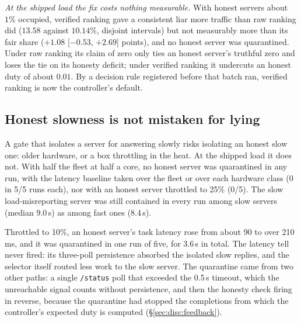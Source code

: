 \documentclass[10pt,twocolumn,letterpaper]{article}
\begin{document}
\emph{At the shipped load the fix costs nothing measurable.} With honest
servers about $1\%$ occupied, verified ranking gave a consistent liar more
traffic than raw ranking did ($13.58$ against $10.14\%$, disjoint intervals)
but not measurably more than its fair share ($+1.08$ [$-0.53$, $+2.69$]
points), and no honest server was quarantined. Under raw ranking its claim of
zero only ties an honest server's truthful zero and loses the tie on its
honesty deficit; under verified ranking it undercuts an honest duty of about
$0.01$. By a decision rule registered before that batch ran, verified ranking
is now the controller's default.

\subsection{Honest slowness is not mistaken for lying}
\label{sec:res:hw}
A gate that isolates a server for answering slowly risks isolating an honest
slow one: older hardware, or a box throttling in the heat. At the shipped load
it does not. With half the fleet at half a core, no honest server was
quarantined in any run, with the latency baseline taken over the fleet or over
each hardware class (0 in 5/5 runs each), nor with an honest server throttled
to 25\% (0/5). The slow load-misreporting server was still contained in every
run among slow servers (median 9.0\,s) as among fast ones (8.4\,s).

Throttled to 10\%, an honest server's task latency rose from about 90 to over
210\,ms, and it was quarantined in one run of five, for 3.6\,s in total. The
latency tell never fired: its three-poll persistence absorbed the isolated
slow replies, and the selector itself routed less work to the slow server. The
quarantine came from two other paths: a single \texttt{/status} poll that
exceeded the 0.5\,s timeout, which the unreachable signal counts without
persistence, and then the honesty check firing in reverse, because the
quarantine had stopped the completions from which the controller's expected
duty is computed (\S\ref{sec:disc:feedback}). 
\end{document}
